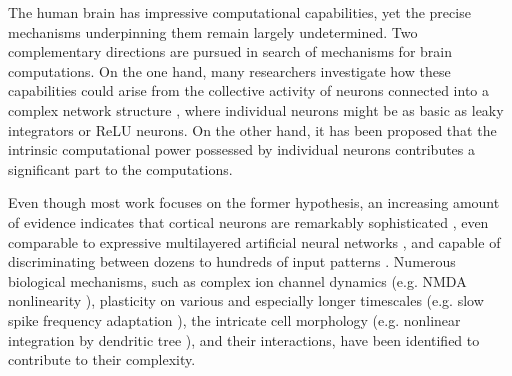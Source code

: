 \documentclass{article} \usepackage{iclr2024_doc_style,times}
\begin{document}
The human brain has impressive computational capabilities, yet the precise mechanisms underpinning them remain largely undetermined. Two complementary directions are pursued in search of mechanisms for brain computations. On the one hand, many researchers investigate how these capabilities could arise from the collective activity of neurons connected into a complex network structure \cite{maass1997networks,gerstner2002spiking,gruning2014spiking}, where individual neurons might be as basic as leaky integrators or ReLU neurons. On the other hand, it has been proposed that the intrinsic computational power possessed by individual neurons \cite{koch1997computation,koch2000role,silver2010neuronal} contributes a significant part to the computations.

Even though most work focuses on the former hypothesis, an increasing amount of evidence indicates that cortical neurons are remarkably sophisticated \cite{silver2010neuronal,gidon2020dendritic,larkum2022dendrites}, even comparable to expressive multilayered artificial neural networks \cite{poirazi2003pyramidal,jadi2014augmented,beniaguev2021single,jones2021might}, and capable of discriminating between dozens to hundreds of input patterns \cite{gutig2006tempotron,hawkins2016neurons,moldwin2020perceptron}. Numerous biological mechanisms, such as complex ion channel dynamics (e.g. NMDA nonlinearity \cite{major2013active,lafourcade2022differential,tang2023diverse}), plasticity on various and especially longer timescales (e.g. slow spike frequency adaptation \cite{kobayashi2009made,bellec_solution_2020}), the intricate cell morphology (e.g. nonlinear integration by dendritic tree \cite{stuart2015dendritic,poirazi2020illuminating,larkum2022dendrites}), and their interactions, have been identified to contribute to their complexity. 
\end{document}
